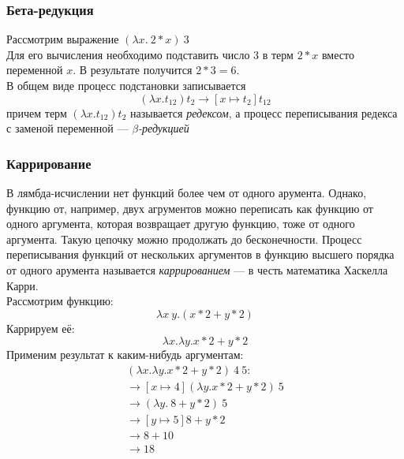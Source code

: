 \documentclass[a4paper, 12pt, titlepage, twoside]{article}
\begin{document}
\subsubsection{Бета-редукция}
Рассмотрим выражение $(\lambda x.\ 2*x)\ 3$\\
Для его вычисления необходимо подставить число $3$ в терм $2 * x$ вместо переменной $x$. В результате получится $2 * 3 = 6$.\\
В общем виде процесс подстановки записывается \[(\lambda x.t_{12}) t_2\longrightarrow [x\mapsto t_2]t_{12}\]
причем терм $(\lambda x.t_{12}) t_2$ называется \textit{редексом}, а процесс переписывания редекса с заменой переменной --- \textit{$\beta$-редукцией}
\subsubsection{Каррирование}
В лямбда-исчислении нет функций более чем от одного арумента. Однако, функцию от, например, двух агрументов можно переписать как функцию от одного аргумента, которая возвращает другую функцию, тоже от одного аргумента. Такую цепочку можно продолжать до бесконечности. Процесс переписывания функций от нескольких аргументов в функцию высшего порядка от одного арумента называется \textit{каррированием} --- в честь математика Хаскелла Карри.\\
Рассмотрим функцию:
\[
\lambda x\ y.(x * 2 + y * 2)
\]
Каррируем её:
\[
\lambda x.\lambda y.x * 2 + y * 2
\]
Применим результат к каким-нибудь аргументам:
\[
\begin{array}{l}
  (\lambda x.\lambda y.x * 2 + y * 2)\ 4\ 5:\\
  \longrightarrow [x\mapsto 4](\lambda y.x * 2 + y * 2)\ 5\\
  \longrightarrow (\lambda y.\ 8 + y * 2)\ 5\\
  \longrightarrow [y\mapsto 5]8 + y * 2\\
  \longrightarrow 8 + 10\\
  \longrightarrow 18\\
\end{array}
\]
\end{document}
